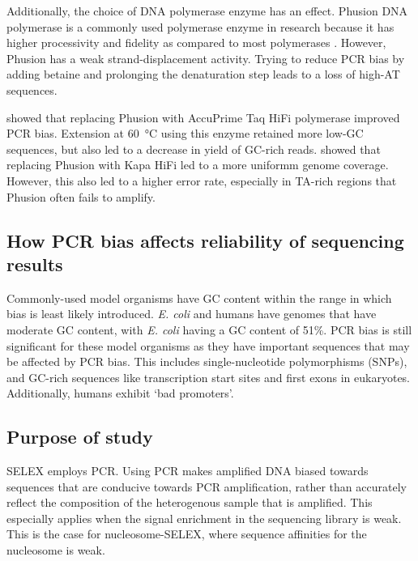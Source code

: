 \documentclass[parskip=full, numbers=noenddot]{scrreprt}
\begin{document}
Additionally, the choice of DNA polymerase enzyme has an effect.  Phusion DNA polymerase is a commonly used polymerase enzyme in research because it has higher processivity and fidelity as compared to most polymerases \citep{quail_optimal_2012}.  However, Phusion has a weak strand-displacement activity.  Trying to reduce PCR bias by adding betaine and prolonging the denaturation step leads to a loss of high-AT sequences.

\citet{aird_analyzing_2011} showed that replacing Phusion with AccuPrime Taq HiFi polymerase improved PCR bias.  Extension at \SI{60}{\celsius} using this enzyme retained more low-GC sequences, but also led to a decrease in yield of GC-rich reads.  \citet{quail_optimal_2012} showed that replacing Phusion with Kapa HiFi led to a more uniformm genome coverage.  However, this also led to a higher error rate, especially in TA-rich regions that Phusion often fails to amplify.

\subsection{How PCR bias affects reliability of sequencing results}
\label{ssec:pcrbias_intro_effects}

Commonly-used model organisms have GC content within the range in which bias is least likely introduced.  \emph{E. coli} and humans have genomes that have moderate GC content, with \emph{E. coli} having a GC content of 51\%.  PCR bias is still significant for these model organisms as they have important sequences that may be affected by PCR bias.  This includes single-nucleotide polymorphisms (SNPs), and GC-rich sequences like transcription start sites and first exons in eukaryotes.  Additionally, humans exhibit `bad promoters'. %

\subsection{Purpose of study}
\label{ssec:pcrbias_intro_why}

SELEX employs PCR.  Using PCR makes amplified DNA biased towards sequences that are conducive towards PCR amplification, rather than accurately reflect the composition of the heterogenous sample that is amplified. %
This especially applies when the signal enrichment in the sequencing library is weak.  This is the case for nucleosome-SELEX, where sequence affinities for the nucleosome is weak.
\end{document}
